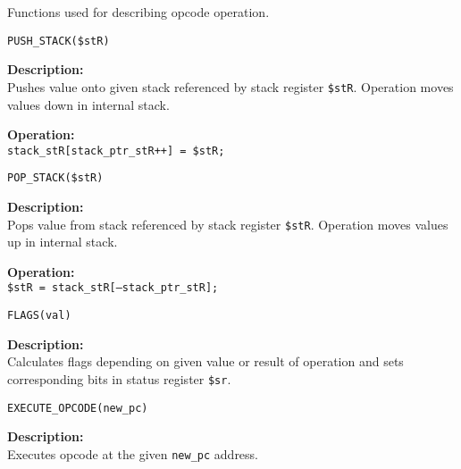 \documentclass[oneside,english,a4paper,10pt,oneside,openany,final]{memoir}
\newcommand{\Code}[1]{\texttt{#1}}
\newcommand{\Function}[1]{\texttt{#1}}
\newcommand{\Register}[1]{\texttt{#1}}
\newcommand{\Variable}[1]{\texttt{#1}}
\begin{document}
Functions used for describing opcode operation.

\begin{description}
  \item \Function{PUSH\_STACK(\$stR)}
  \begin{description}
	\item \textbf{Description:} \\ 
      Pushes value onto given stack referenced by stack register \Register{\$stR}. Operation moves values down in internal stack.

    \item \textbf{Operation:} \\
      \Code{stack\_stR[stack\_ptr\_stR++] = \$stR;}
  \end{description}
\end{description}

\begin{description}
  \item \Function{POP\_STACK(\$stR)}
  \begin{description}
	\item \textbf{Description:} \\ 
      Pops value from stack referenced by stack register \Register{\$stR}. Operation moves values up in internal stack.

    \item \textbf{Operation:} \\
      \Code{\$stR = stack\_stR[--stack\_ptr\_stR];}
  \end{description}
\end{description}

\begin{description}
  \item \Function{FLAGS(val)}
  \begin{description}
    \item\textbf{Description:} \\
      Calculates flags depending on given value or result of operation and sets corresponding bits in status register \Register{\$sr}.
  \end{description}
\end{description}

\begin{description}
  \item \Function{EXECUTE\_OPCODE(new\_pc)}
  \begin{description}
    \item \textbf{Description:} \\
      Executes opcode at the given \Variable{new\_pc} address.
  \end{description}
\end{description}
\end{document}
